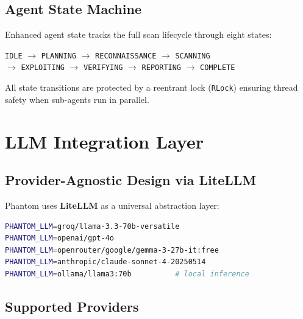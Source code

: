 \documentclass[12pt,a4paper]{article}
\begin{document}
\subsection{Agent State Machine}

Enhanced agent state tracks the full scan lifecycle through eight states:

\begin{center}
\texttt{IDLE} $\rightarrow$ \texttt{PLANNING} $\rightarrow$ \texttt{RECONNAISSANCE} $\rightarrow$ \texttt{SCANNING}\\
$\rightarrow$ \texttt{EXPLOITING} $\rightarrow$ \texttt{VERIFYING} $\rightarrow$ \texttt{REPORTING} $\rightarrow$ \texttt{COMPLETE}
\end{center}

All state transitions are protected by a reentrant lock (\texttt{RLock}) ensuring thread safety when sub-agents run in parallel.



\section{LLM Integration Layer}

\subsection{Provider-Agnostic Design via LiteLLM}

Phantom uses \textbf{LiteLLM} as a universal abstraction layer:

\begin{lstlisting}[language=bash, caption={Model selection examples}]
PHANTOM_LLM=groq/llama-3.3-70b-versatile
PHANTOM_LLM=openai/gpt-4o
PHANTOM_LLM=openrouter/google/gemma-3-27b-it:free
PHANTOM_LLM=anthropic/claude-sonnet-4-20250514
PHANTOM_LLM=ollama/llama3:70b          # local inference
\end{lstlisting}

\subsection{Supported Providers}
\end{document}
